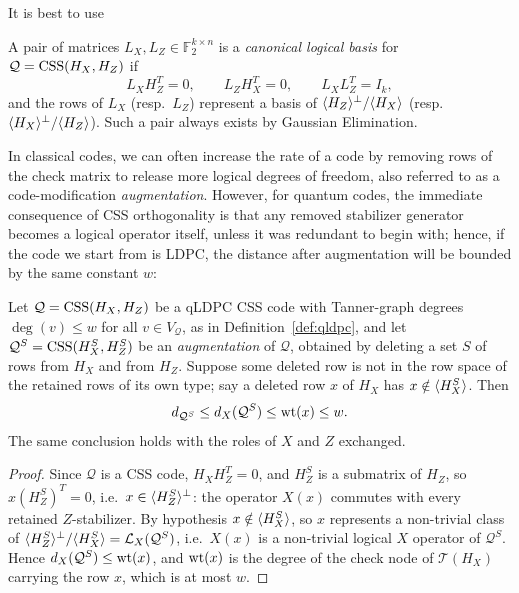 It is best to use 
 
\begin{definition}\label{def:logical-basis}
A pair of matrices $L_X, L_Z \in \mathbb F_2^{k\times n}$ is a \emph{canonical logical basis} for
$\mathcal Q = \mathrm{CSS}(H_X,H_Z)$ if
\[
L_X H_Z^T = 0,\qquad L_Z H_X^T = 0, \qquad L_XL_Z^T = I_k,
\]
and the rows of $L_X$ (resp.\ $L_Z$) represent a basis of $\langle H_Z \rangle^\perp/\langle H_X \rangle$ (resp. $\langle H_X \rangle^\perp/\langle H_Z \rangle$). Such a pair always exists by Gaussian Elimination.
\end{definition}

In classical codes, we can often increase the rate of a code by removing rows of the check matrix to release more logical degrees of freedom, also referred to as a code-modification \emph{augmentation}. However, for quantum codes, the immediate consequence of CSS orthogonality is that any removed stabilizer generator becomes a logical operator itself, unless it was redundant to begin with; hence, if the code we start from is LDPC, the distance after augmentation will be bounded by the same constant $w$:


\begin{fact}\label{fact:augmentation}
Let $\mathcal Q = \mathrm{CSS}(H_X,H_Z)$ be a qLDPC CSS code with Tanner-graph degrees $\deg (v)\leq w$ for all $v\in V_{\mathcal Q}$, as in Definition~\ref{def:qldpc}, and let
$\mathcal{Q}^S = \mathrm{CSS}(H^S_X, H^S_Z)$ be an \emph{augmentation} of $\mathcal Q$, obtained by deleting a set $S$ of rows from $H_X$ and from $H_Z$. Suppose some deleted row is not in the row space of the retained rows of its own type; say a deleted row $x$ of $H_X$ has $x\notin \langle H^S_X \rangle$. Then
\begin{equation}\label{eq:augmentation-barrier}
    d_{\mathcal{Q}^S}\leq d_X(\mathcal Q^S)\leq \mathrm{wt}(x)\leq w.
\end{equation}
The same conclusion holds with the roles of $X$ and $Z$ exchanged.
\end{fact}
\begin{proof}
Since $\mathcal Q$ is a CSS code, $H_XH_Z^T = 0$, and $H^S_Z$ is a submatrix of $H_Z$, so $x (H^S_Z)^T = 0$, i.e.\ $x\in \langle H^S_Z \rangle^\perp$: the operator $X(x)$ commutes with every retained $Z$-stabilizer. By hypothesis $x\notin\langle H^S_X \rangle$, so $x$ represents a non-trivial class of $\langle H^S_Z \rangle^\perp/\langle H^S_X \rangle = \mathcal L_X(\mathcal Q^S)$, i.e.\ $X(x)$ is a non-trivial logical $X$ operator of $\mathcal Q^S$. Hence $d_X(\mathcal Q^S)\leq\mathrm{wt}(x)$, and $\mathrm{wt}(x)$ is the degree of the check node of $\mathcal T(H_X)$ carrying the row $x$, which is at most $w$.
\end{proof}

